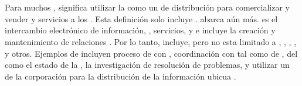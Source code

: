 
%
%

\section{\ecommerceCOM}
Para muchos \businessCOM, \ecommerceCOM significa utilizar la \internetINT como un \channelCOM de distribución para comercializar y vender \itemsCOM y servicios a los \customersCOM. Esta definición solo incluye \internetINT \commerceCOM. \ecommerceCOM abarca aún más. \ecommerceCOM es el intercambio electrónico de información, \itemsCOM, servicios, y \paymentsCOM e incluye la creación y mantenimiento de relaciones \webBasedCPT. Por lo tanto, \ecommerceCOM incluye, pero no esta limitado a \internetINT, \intranetsINT, \extranetsINT, \electDataInterCOM, y otros. Ejemplos de \ecommerceCOM incluyen proceso de \transactionsDB con \electronicpayCOM, coordinación con \partnerCPT \businessCOM tal como \managementCOM  de \inventoryCommerce, \selfServiceCPT del \customerCOM como \trackingCPT el estado de la \orderCommerce, la investigación de resolución de problemas, y utilizar un \intranetINT de la corporación para la distribución de la información ubicua \cite{fruhling2000impact}.





